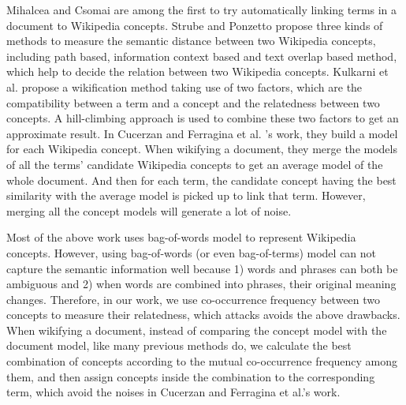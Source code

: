 Mihalcea and Csomai \cite{MihalceaC07} are among the first to try
automatically linking terms in a document to Wikipedia concepts. Strube and
Ponzetto\cite{StrubeP06} propose three kinds of methods to measure the semantic
distance between two Wikipedia concepts, including path based, information
context based and text overlap based method, which help to decide the relation
between two Wikipedia concepts.
Kulkarni et al. \cite{kulkarni2009collective} propose a wikification method
taking use of two factors, which are the compatibility between a term and a
concept and the relatedness between two concepts. A hill-climbing approach
is used to combine these two factors to get an approximate result.
In Cucerzan \cite{cucerzan2007large} and Ferragina et al. \cite{ferragina2010tagme}'s
work, they build a model for each Wikipedia concept. When wikifying a document, 
they merge the models of all the terms' candidate Wikipedia concepts to get
an average model of the whole document. And then for each term, the candidate concept
having the best similarity with the average model is picked up to link that term.
However, merging all the concept models will generate a lot of noise.

Most of the above work uses bag-of-words model to represent Wikipedia concepts.
However, using bag-of-words (or even bag-of-terms) model can not capture the 
semantic information well because
1) words and phrases can both be ambiguous and 2) when words are combined into phrases, 
their original meaning changes. Therefore, in our work, we use co-occurrence
frequency between two concepts to measure their relatedness, which 
attacks avoids the above drawbacks. 
When wikifying a document, instead of comparing the concept model with
the document model, like many previous methods do, 
we calculate the best combination of concepts according to
the mutual co-occurrence frequency among them, and then assign concepts inside
the combination to the corresponding term, which avoid the noises in 
Cucerzan and Ferragina et al.'s work.



